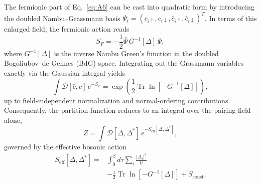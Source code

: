 \documentclass[aps,prb,twocolumn,superscriptaddress,floatfix]{revtex4-2}
\newcommand{\Tr}{\operatorname{Tr}}
\begin{document}
The fermionic part of Eq.~\eqref{eq:A6} can be cast into quadratic form by introducing the doubled Nambu--Grassmann basis $\Psi_i = (c_{i\uparrow}, c_{i\downarrow}, \bar{c}_{i\uparrow}, \bar{c}_{i\downarrow})^T$. In terms of this enlarged field, the fermionic action reads
\begin{equation}
S_F = -\frac{1}{2} \bar{\Psi}\, G^{-1}[\Delta]\, \Psi,
\label{eq:A7}
\end{equation}
where $G^{-1}[\Delta]$ is the inverse Nambu Green's function in the doubled Bogoliubov--de Gennes (BdG) space. Integrating out the Grassmann variables exactly via the Gaussian integral yields
\begin{equation}
\int \mathcal{D}[\bar{c},c]\, e^{-S_F} = \exp\left( \frac{1}{2}\Tr\ln\left[-G^{-1}[\Delta]\right] \right),
\label{eq:A8}
\end{equation}
up to field-independent normalization and normal-ordering contributions. Consequently, the partition function reduces to an integral over the pairing field alone,
\begin{equation}
Z = \int \mathcal{D}[\Delta,\Delta^*]\, e^{-S_{\mathrm{eff}}[\Delta,\Delta^*]},
\label{eq:A9}
\end{equation}
governed by the effective bosonic action
\begin{equation}
\begin{aligned}
S_{\mathrm{eff}}[\Delta,\Delta^*] ={}& \int_0^\beta d\tau \sum_i \frac{|\Delta_i|^2}{U} \\
& - \frac{1}{2}\Tr\ln\left[-G^{-1}[\Delta]\right] + S_{\mathrm{const}}.
\end{aligned}
\label{eq:A10}
\end{equation}
\end{document}

